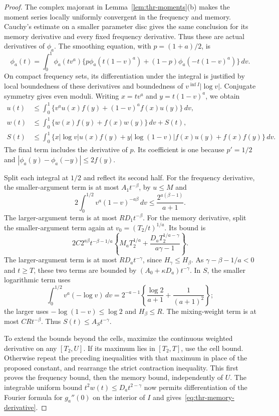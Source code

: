 \begin{proof}
The complex majorant in Lemma~\ref{lem:thr-moments}(b) makes the
moment series locally uniformly convergent in the frequency and memory.
Cauchy's estimate on a smaller parameter disc gives the same conclusion
for its memory derivative and every fixed frequency derivative.
Thus these are actual derivatives of $\phi_a$.
The smoothing equation, with $p=(1+a)/2$, is
\[
 \phi_a(t)=\int_0^1\phi_a(tv^a)
 \{p\phi_a(t(1-v)^a)+(1-p)\phi_a(-t(1-v)^a)\}\,dv.
\]
On compact frequency sets, its differentiation under the integral is
justified by local boundedness of these derivatives and boundedness of
$v^{\inf I}|\log v|$. Conjugate symmetry gives even moduli.
Writing $x=tv^a$ and $y=t(1-v)^a$, we obtain
\begin{align*}
 u(t)&\le\int_0^1\{v^au(x)f(y)+(1-v)^af(x)u(y)\}\,dv,\\
 w(t)&\le\int_0^1\{w(x)f(y)+f(x)w(y)\}\,dv+S(t),\\
 S(t)&\le\int_0^1\{x|\log v|u(x)f(y)
             +y|\log(1-v)|f(x)u(y)+f(x)f(y)\}\,dv.
\end{align*}
The final term includes the derivative of $p$. Its coefficient is one because $p'=1/2$ and $|\phi_a(y)-\phi_a(-y)|\le2f(y)$.

Split each integral at $1/2$ and reflect its second half. For the
frequency derivative, the smaller-argument term is at most
$A_1t^{-\beta}$, by $u\le M$ and
\[
 2\int_0^{1/2}v^a(1-v)^{-a\beta}\,dv
 \le\frac{2^{a(\beta-1)}}{a+1}.
\]
The larger-argument term is at most $RD_1t^{-\beta}$.
For the memory derivative, split the smaller-argument term again at
$v_0=(T_2/t)^{1/a}$. Its bound is
\[
 2C2^{a\beta}t^{-\beta-1/a}
 \left\{M_aT_2^{1/a}+
 \frac{D_aT_2^{1/a-\gamma}}{a\gamma-1}\right\}.
\]
The larger-argument term is at most $RD_at^{-\gamma}$, since
$H_\gamma\le H_\beta$. As $\gamma-\beta-1/a<0$ and $t\ge T$,
these two terms are bounded by $(A_0+\kappa D_a)t^{-\gamma}$.
In $S$, the smaller logarithmic term uses
\[
 \int_0^{1/2}v^a(-\log v)\,dv
 =2^{-a-1}\left\{\frac{\log2}{a+1}+\frac1{(a+1)^2}\right\};
\]
the larger uses $-\log(1-v)\le\log2$ and $H_\beta\le R$.
The mixing-weight term is at most $CRt^{-\beta}$.
Thus $S(t)\le A_St^{-\gamma}$.

To extend the bounds beyond the cells, maximize the continuous weighted derivative on any $[T_2,U]$.
If its maximum lies in $[T_2,T]$, use the cell bound. Otherwise repeat
the preceding inequalities with that maximum in place of the proposed
constant, and rearrange the strict contraction inequality. This first
proves the frequency bound, then the memory bound, independently of $U$.
The integrable uniform bound $t^2w(t)\le D_at^{2-\gamma}$ now permits
differentiation of the Fourier formula for $g_a''(0)$ on the interior
of $I$ and gives~\eqref{eq:thr-memory-derivative}.
\end{proof}

